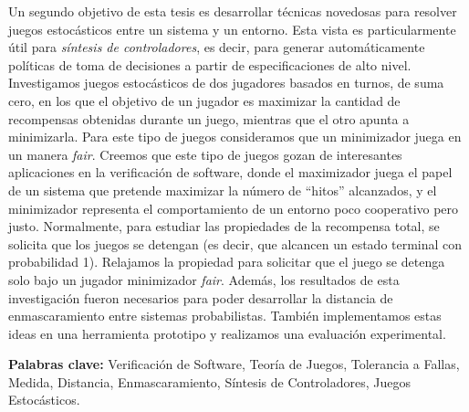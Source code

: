 Un segundo objetivo de esta tesis es desarrollar técnicas novedosas para resolver juegos estocásticos entre un sistema y un entorno. Esta vista es particularmente útil para \emph{síntesis de controladores}, es decir, para generar automáticamente políticas de toma de decisiones a partir de especificaciones de alto nivel.
Investigamos juegos estocásticos de dos jugadores basados en turnos, de suma cero, en los que el objetivo de un jugador es maximizar la cantidad de recompensas obtenidas durante un juego, mientras que el otro apunta a minimizarla. %
Para este tipo de juegos consideramos que un minimizador juega en un
manera \textit{fair}. Creemos que este tipo de juegos gozan de interesantes aplicaciones en la verificación de software, donde el maximizador juega el papel de un sistema que pretende maximizar la
número de ``hitos'' alcanzados, y el minimizador representa el comportamiento de un entorno poco cooperativo pero justo.
Normalmente, para estudiar las propiedades de la recompensa total, se solicita que los juegos se detengan (es decir, que alcancen un estado terminal con probabilidad 1). %
Relajamos la propiedad para solicitar que el juego se detenga solo bajo un jugador minimizador \textit{fair}. Además, los resultados de esta investigación fueron necesarios para poder desarrollar la distancia de enmascaramiento entre sistemas probabilistas. También implementamos estas ideas en una herramienta prototipo y realizamos una evaluación experimental.

\noindent
\textbf{Palabras clave:} Verificación de Software, Teoría de Juegos, Tolerancia a Fallas, Medida, Distancia, Enmascaramiento, Síntesis de Controladores, Juegos Estocásticos.